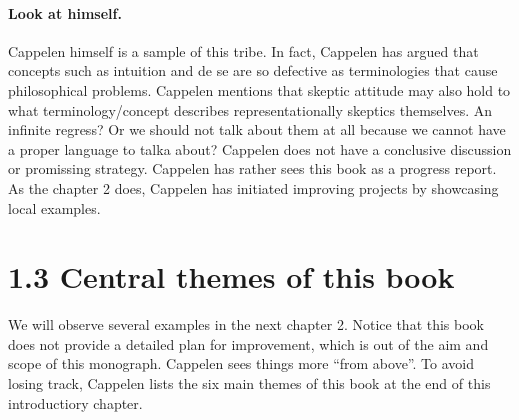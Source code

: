 \documentclass[
10pt, %
a4paper, %
twocolumn, %
landscape %
]{article}
\begin{document}
\paragraph{Look at himself.}
Cappelen himself is a sample of this tribe.
In fact, Cappelen has argued that concepts such as intuition and de se are so defective as terminologies that cause philosophical problems.
Cappelen mentions that skeptic attitude may also hold to what terminology/concept describes representationally skeptics themselves. An infinite regress? Or we should not talk about them at all because we cannot have a proper language to talka about? Cappelen does not have a conclusive discussion or promissing strategy. Cappelen has rather sees this book as a progress report. As the chapter 2 does, Cappelen has initiated improving projects by showcasing local examples.

\section*{1.3 Central themes of this book}
We will observe several examples in the next chapter 2. Notice that this book does not provide a detailed plan for improvement, which is out of the aim and scope of this monograph. Cappelen sees things more ``from above''.
To avoid losing track, Cappelen lists the six main themes of this book at the end of this introductiory chapter.
\end{document}
